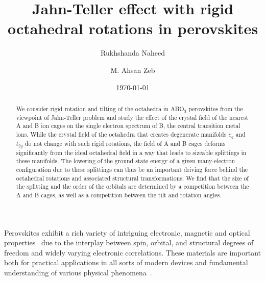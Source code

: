 \documentclass[a4paper,prb,twocolumn]{revtex4-1}  %
\begin{document}
\title{Jahn-Teller effect with rigid octahedral rotations in perovskites} %


\author{Rukhshanda Naheed}

\author{M. Ahsan Zeb}

\date{\today}
\begin{abstract}

We consider
rigid rotation and tilting of the 
octahedra
 in ABO$_3$ perovskites
 from the viewpoint of Jahn-Teller problem
 and study the
effect of the crystal field of the nearest A and B ion cages 
on the single electron spectrum of B, the 
central 
transition metal ions.
While the crystal field of the octahedra 
that 
creates degenerate manifolds $e_g$ and $t_{2g}$
do not change with such rigid rotations, 
the field of 
A and B cages
deforms significantly %
from the ideal octahedral field
in a way that
leads to sizeable splittings in 
these manifolds.
The lowering of the ground state energy
of a given many-electron configuration
due to these splittings
can thus be an important driving force behind the octahedral rotations 
and associated structural transformations.
We find that the size of the splitting and the 
order of the orbitals
are
determined by a competition between the A and B cages, 
as well as a competition between the tilt and rotation angles.

\end{abstract}
\maketitle


Perovskites  
exhibit a rich variety of intriguing 
electronic,
magnetic
 and optical
properties~\cite{ZubkoARCMP11,
HwangNM12, 
BhattacharyaARMR14,
HellmanRMP17,
ChenJPCM17,DagottoS05,DagottoMRSB08}
due to the interplay between
spin, orbital, and structural degrees of 
freedom
and widely varying electronic 
correlations.
These materials 
are important
both for practical applications in all sorts of modern devices 
and 
fundamental understanding of various physical 
phenomena~\cite{SalamonRMP01,
WangS03,
DawberRMP05,
SchlomARMR07,
KosterRMP12}.
\end{document}
